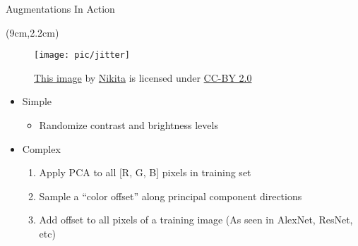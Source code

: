 \documentclass[serif, aspectratio=169]{beamer}
\begin{document}
\begin{frame}{Augmentations In Action}
	\begin{textblock*}{6cm}(9cm,2.2cm) %
		\begin{figure}
			\texttt{[image: pic/jitter]}
			\caption*{\tiny{\href{https://www.flickr.com/photos/malfet/1428198050}{\color{blue} This image} by \href{https://www.flickr.com/photos/malfet/}{\color{blue} Nikita} is licensed under \href{https://creativecommons.org/licenses/by/2.0/}{\color{blue} CC-BY 2.0}}}
		\end{figure}

	\end{textblock*}
	
	\begin{itemize}
		\item Simple
		\begin{itemize}
			\item Randomize contrast and brightness levels
		\end{itemize}
		\item Complex
		\begin{enumerate}
			\item Apply PCA to all [R, G, B] pixels \newline in training set
			\item Sample a “color offset” along principal \newline component directions
			\item Add offset to all pixels of a training \newline image
			\newline \small{(As seen in AlexNet, ResNet, etc)}
		\end{enumerate}
	\end{itemize}
\end{frame}
\end{document}
